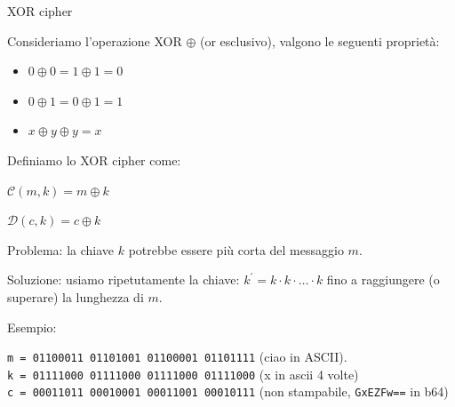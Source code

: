 \documentclass[handout, xcolor=dvipsnames,aspectratio=169]{beamer}
\begin{document}
\begin{frame}{XOR cipher}

  Consideriamo l'operazione XOR $\oplus$ (or esclusivo), valgono le seguenti proprietà:
  
  \begin{itemize}
    \item $0 \oplus 0 = 1 \oplus 1 = 0$ 
    \item $0 \oplus 1 = 0 \oplus 1 = 1$ 
    \item $x \oplus y \oplus y = x$ 
  \end{itemize}
  
  \medskip
  \pause
  
  Definiamo lo XOR cipher come:
    
  $\mathcal{C}(m, k) = m \oplus k$ 
  
  $\mathcal{D}(c, k) = c \oplus k$

  \medskip
  
  \pause

  Problema: la chiave $k$ potrebbe essere più corta del messaggio $m$.
  
  Soluzione: usiamo ripetutamente la chiave: $k^{'} = k \cdot k \cdot \ldots \cdot k$ fino a raggiungere (o superare) la lunghezza di $m$.

  \medskip
  \pause
  
  Esempio:
  
  \texttt{m = 01100011 01101001 01100001 01101111} (ciao in ASCII).\\
  \texttt{k = 01111000 01111000 01111000 01111000} (x in ascii 4 volte)\\
  \texttt{c = 00011011 00010001 00011001 00010111} (non stampabile, \texttt{GxEZFw==} in b64)
  
  
\end{frame}
\end{document}
